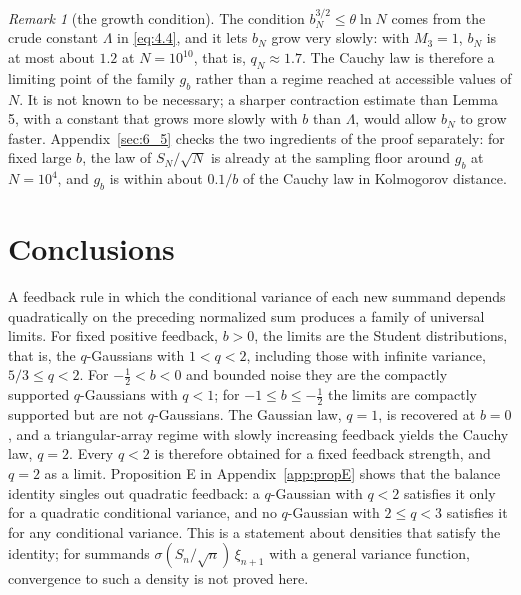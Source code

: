 \documentclass[aip,jmp,preprint,onecolumn,floatfix,superscriptaddress,nofootinbib,11pt]{revtex4-2}
\theoremstyle{plain}
\theoremstyle{remark}
\newtheorem*{remark}{Remark}
\numberwithin{equation}{section}
\begin{document}
\begin{remark}[the growth condition]
The condition $b_N^{3/2}\le\theta\ln N$ comes from the crude constant $\Lambda$ in \eqref{eq:4.4}, and it lets $b_N$ grow very slowly: with $M_3=1$, $b_N$ is at most about $1.2$ at $N=10^{10}$, that is, $q_N\approx1.7$. The Cauchy law is therefore a limiting point of the family $g_b$ rather than a regime reached at accessible values of $N$. It is not known to be necessary; a sharper contraction estimate than Lemma 5, with a constant that grows more slowly with $b$ than $\Lambda$, would allow $b_N$ to grow faster. Appendix~\ref{sec:6_5} checks the two ingredients of the proof separately: for fixed large $b$, the law of $S_N/\sqrt N$ is already at the sampling floor around $g_b$ at $N=10^{4}$, and $g_b$ is within about $0.1/b$ of the Cauchy law in Kolmogorov distance.
\end{remark}

\section{Conclusions}\label{sec:concl}

A feedback rule in which the conditional variance of each new summand depends quadratically on the preceding normalized sum produces a family of universal limits. For fixed positive feedback, $b>0$, the limits are the Student distributions, that is, the $q$-Gaussians with $1<q<2$, including those with infinite variance, $5/3\le q<2$. For $-\tfrac12<b<0$ and bounded noise they are the compactly supported $q$-Gaussians with $q<1$; for $-1\le b\le-\tfrac12$ the limits are compactly supported but are not $q$-Gaussians. The Gaussian law, $q=1$, is recovered at $b=0$, and a triangular-array regime with slowly increasing feedback yields the Cauchy law, $q=2$. Every $q<2$ is therefore obtained for a fixed feedback strength, and $q=2$ as a limit. Proposition E in Appendix~\ref{app:propE} shows that the balance identity singles out quadratic feedback: a $q$-Gaussian with $q<2$ satisfies it only for a quadratic conditional variance, and no $q$-Gaussian with $2\le q<3$ satisfies it for any conditional variance. This is a statement about densities that satisfy the identity; for summands $\sigma(S_n/\sqrt n)\,\xi_{n+1}$ with a general variance function, convergence to such a density is not proved here.
\end{document}
